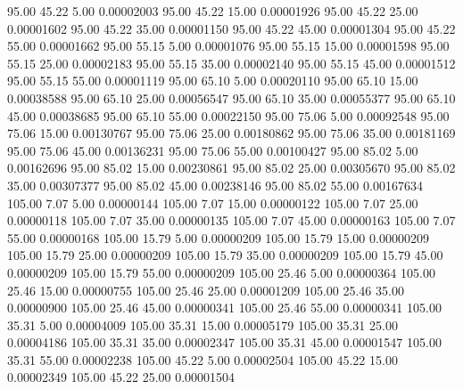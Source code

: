      95.00     45.22      5.00     0.00002003
     95.00     45.22     15.00     0.00001926
     95.00     45.22     25.00     0.00001602
     95.00     45.22     35.00     0.00001150
     95.00     45.22     45.00     0.00001304
     95.00     45.22     55.00     0.00001662
     95.00     55.15      5.00     0.00001076
     95.00     55.15     15.00     0.00001598
     95.00     55.15     25.00     0.00002183
     95.00     55.15     35.00     0.00002140
     95.00     55.15     45.00     0.00001512
     95.00     55.15     55.00     0.00001119
     95.00     65.10      5.00     0.00020110
     95.00     65.10     15.00     0.00038588
     95.00     65.10     25.00     0.00056547
     95.00     65.10     35.00     0.00055377
     95.00     65.10     45.00     0.00038685
     95.00     65.10     55.00     0.00022150
     95.00     75.06      5.00     0.00092548
     95.00     75.06     15.00     0.00130767
     95.00     75.06     25.00     0.00180862
     95.00     75.06     35.00     0.00181169
     95.00     75.06     45.00     0.00136231
     95.00     75.06     55.00     0.00100427
     95.00     85.02      5.00     0.00162696
     95.00     85.02     15.00     0.00230861
     95.00     85.02     25.00     0.00305670
     95.00     85.02     35.00     0.00307377
     95.00     85.02     45.00     0.00238146
     95.00     85.02     55.00     0.00167634
    105.00      7.07      5.00     0.00000144
    105.00      7.07     15.00     0.00000122
    105.00      7.07     25.00     0.00000118
    105.00      7.07     35.00     0.00000135
    105.00      7.07     45.00     0.00000163
    105.00      7.07     55.00     0.00000168
    105.00     15.79      5.00     0.00000209
    105.00     15.79     15.00     0.00000209
    105.00     15.79     25.00     0.00000209
    105.00     15.79     35.00     0.00000209
    105.00     15.79     45.00     0.00000209
    105.00     15.79     55.00     0.00000209
    105.00     25.46      5.00     0.00000364
    105.00     25.46     15.00     0.00000755
    105.00     25.46     25.00     0.00001209
    105.00     25.46     35.00     0.00000900
    105.00     25.46     45.00     0.00000341
    105.00     25.46     55.00     0.00000341
    105.00     35.31      5.00     0.00004009
    105.00     35.31     15.00     0.00005179
    105.00     35.31     25.00     0.00004186
    105.00     35.31     35.00     0.00002347
    105.00     35.31     45.00     0.00001547
    105.00     35.31     55.00     0.00002238
    105.00     45.22      5.00     0.00002504
    105.00     45.22     15.00     0.00002349
    105.00     45.22     25.00     0.00001504
